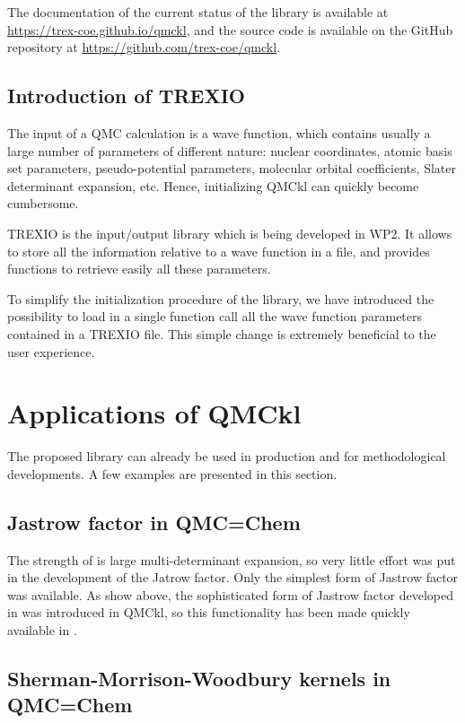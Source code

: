 The documentation of the current status of the library is available
at \url{https://trex-coe.github.io/qmckl}, and the source code is
available on the GitHub repository at \url{https://github.com/trex-coe/qmckl}.


\subsection{Introduction of TREXIO}

The input of a \ac{QMC} calculation is a wave function, which
contains usually a large number of parameters of different nature:
nuclear coordinates, atomic basis set parameters, pseudo-potential
parameters, molecular orbital coefficients, Slater determinant
expansion, etc.
Hence, initializing \ac{QMCkl} can quickly become cumbersome.

TREXIO is the input/output library which is being developed in
\ac{WP}2. It allows to store all the information relative to a wave
function in a file, and provides functions to retrieve easily all
these parameters. 

To simplify the initialization procedure of the library, we have
introduced the possibility to load in a single function call all the
wave function parameters contained in a TREXIO file. This simple
change is extremely beneficial to the user experience.


\section{Applications of QMCkl}

The proposed library can already be used in production and for
methodological developments. A few examples are presented in this section.

\subsection{Jastrow factor in QMC=Chem}

The strength of \qmcchem{} is large multi-determinant expansion, so very
little effort was put in the development of the Jatrow factor. Only the
simplest form of Jastrow factor was available. As show above, the
sophisticated form of Jastrow factor developed in \champ{} was introduced
in \ac{QMCkl}, so this functionality has been made quickly available
in \qmcchem.

\subsection{Sherman-Morrison-Woodbury kernels in QMC=Chem}

